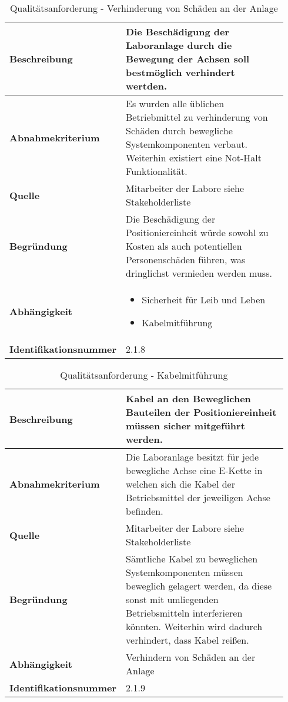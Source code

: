 \documentclass[../Bachelorarbeit.tex]{subfiles}
\begin{document}
\begin{table}[H]
    \centering
    \begin{tabular}{| p{0.34\linewidth} | p{0.6\linewidth} |}
        \hline
        \textbf{Beschreibung} & Die Beschädigung der Laboranlage durch die Bewegung der Achsen soll bestmöglich verhindert wertden. \\ \hline
        \textbf{Abnahmekriterium} & Es wurden alle üblichen Betriebmittel zu verhinderung von Schäden durch bewegliche Systemkomponenten verbaut. Weiterhin existiert eine Not-Halt Funktionalität. \\ \hline
        \textbf{Quelle} & Mitarbeiter der Labore siehe Stakeholderliste \\ \hline
        \textbf{Begründung} & Die Beschädigung der Positioniereinheit würde sowohl zu Kosten als auch potentiellen Personenschäden führen, was dringlichst vermieden werden muss. \\ \hline
        \textbf{Abhängigkeit} & {\begin{itemize}[noitemsep,topsep=0pt,parsep=0pt,partopsep=0pt,leftmargin=*]
                                    \item Sicherheit für Leib und Leben
                                    \item Kabelmitführung
                                \end{itemize}} \\ \hline
        \textbf{Identifikationsnummer} & 2.1.8 \\ \hline
    \end{tabular}
    \caption[\acs{nfa} - Verhinderung von Schäden an der Anlage]{Qualitätsanforderung - Verhinderung von Schäden an der Anlage}
    \label{tab:my-table18}
\end{table}

\begin{table}[H]
    \centering
    \begin{tabular}{| p{0.34\linewidth} | p{0.6\linewidth} |}
        \hline
        \textbf{Beschreibung} & Kabel an den Beweglichen Bauteilen der Positioniereinheit müssen sicher mitgeführt werden. \\ \hline
        \textbf{Abnahmekriterium} & Die Laboranlage besitzt für jede bewegliche Achse eine E-Kette in welchen sich die Kabel der Betriebsmittel der jeweiligen Achse befinden. \\ \hline
        \textbf{Quelle} & Mitarbeiter der Labore siehe Stakeholderliste \\ \hline
        \textbf{Begründung} & Sämtliche Kabel zu beweglichen Systemkomponenten müssen beweglich gelagert werden, da diese sonst mit umliegenden Betriebsmitteln interferieren könnten. Weiterhin wird dadurch verhindert, dass Kabel reißen. \\ \hline
        \textbf{Abhängigkeit} & Verhindern von Schäden an der Anlage \\ \hline
        \textbf{Identifikationsnummer} & 2.1.9 \\ \hline
    \end{tabular}
    \caption[\acs{nfa} - Kabelmitführung]{Qualitätsanforderung - Kabelmitführung}
    \label{tab:my-table19}
\end{table}
\end{document}
